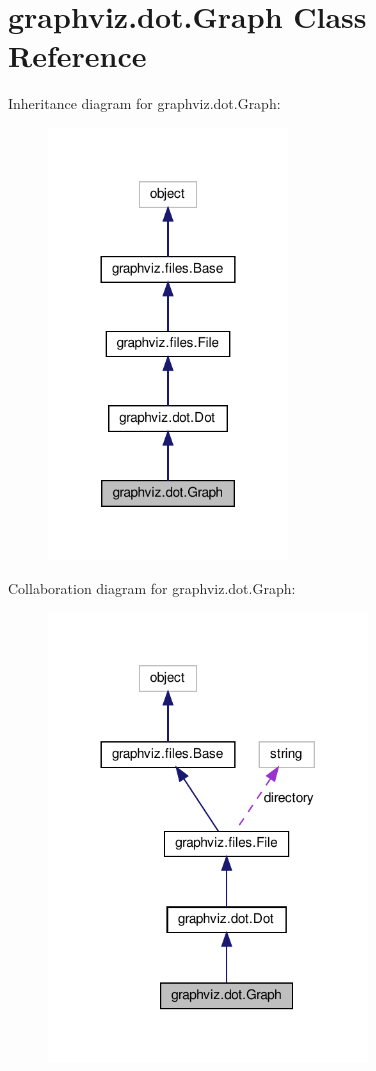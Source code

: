 \hypertarget{classgraphviz_1_1dot_1_1Graph}{}\section{graphviz.\+dot.\+Graph Class Reference}
\label{classgraphviz_1_1dot_1_1Graph}


Inheritance diagram for graphviz.\+dot.\+Graph\+:
\nopagebreak
\begin{figure}[H]
\begin{center}
\leavevmode
\includegraphics[width=180pt]{classgraphviz_1_1dot_1_1Graph__inherit__graph}
\end{center}
\end{figure}


Collaboration diagram for graphviz.\+dot.\+Graph\+:
\nopagebreak
\begin{figure}[H]
\begin{center}
\leavevmode
\includegraphics[width=240pt]{classgraphviz_1_1dot_1_1Graph__coll__graph}
\end{center}
\end{figure}
